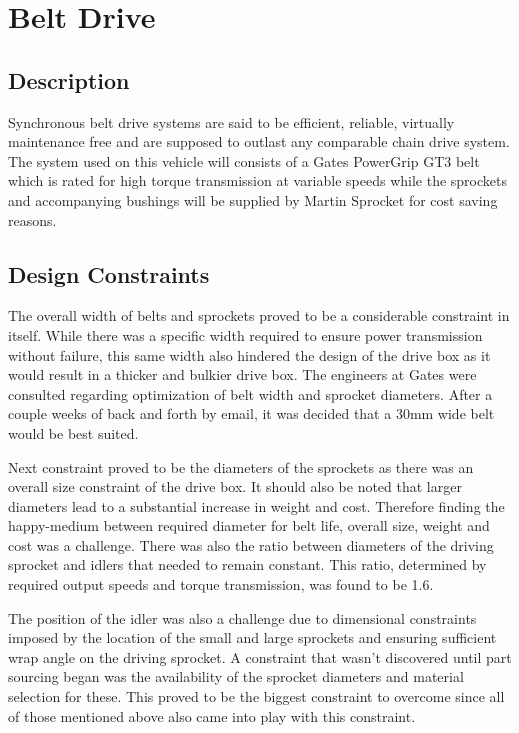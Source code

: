 \section{Belt Drive}
\subsection{Description}
Synchronous belt drive systems are said to be efficient, reliable, virtually maintenance free and are supposed to outlast any comparable chain drive system. The system used on this vehicle will consists of a Gates PowerGrip GT3 belt which is rated for high torque transmission at variable speeds while the sprockets and accompanying bushings will be supplied by Martin Sprocket for cost saving reasons.

\subsection{Design Constraints}
The overall width of belts and sprockets proved to be a considerable constraint in itself. While there was a specific width required to ensure power transmission without failure, this same width also hindered the design of the drive box as it would result in a thicker and bulkier drive box. The engineers at Gates were consulted regarding optimization of belt width and sprocket diameters. After a couple weeks of back and forth by email, it was decided that a 30mm wide belt would be best suited.

Next constraint proved to be the diameters of the sprockets as there was an overall size constraint of the drive box. It should also be noted that larger diameters lead to a substantial increase in weight and cost. Therefore finding the happy-medium between required diameter for belt life, overall size, weight and cost was a challenge. There was also the ratio between diameters of the driving sprocket and idlers that needed to remain constant. This ratio, determined by required output speeds and torque transmission, was found to be 1.6.

The position of the idler was also a challenge due to dimensional constraints imposed by the location of the small and large sprockets and ensuring sufficient wrap angle on the driving sprocket. A constraint that wasn’t discovered until part sourcing began was the availability of the sprocket diameters and material selection for these. This proved to be the biggest constraint to overcome since all of those mentioned above also came into play with this constraint.

